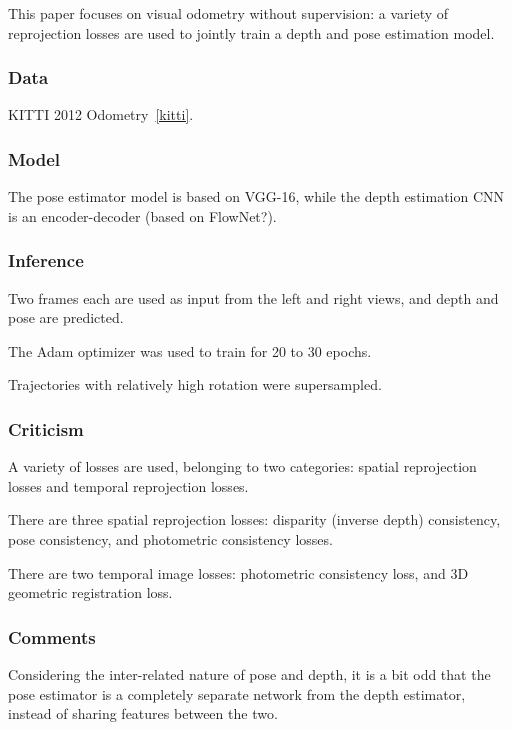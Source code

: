 \documentclass[a4paper, 12pt]{article}
\begin{document}
This paper focuses on visual odometry without supervision: a variety of
reprojection losses are used to jointly train a depth and pose estimation
model.


\subsubsection{Data}

KITTI 2012 Odometry~\ref{kitti}.


\subsubsection{Model}

The pose estimator model is based on VGG-16, while the depth estimation CNN is
an encoder-decoder (based on FlowNet?).


\subsubsection{Inference}

Two frames each are used as input from the left and right views, and depth and
pose are predicted.

The Adam optimizer was used to train for 20 to 30 epochs.

Trajectories with relatively high rotation were supersampled.


\subsubsection{Criticism}

A variety of losses are used, belonging to two categories: spatial reprojection
losses and temporal reprojection losses.

There are three spatial reprojection losses: disparity (inverse depth)
consistency, pose consistency, and photometric consistency losses.

There are two temporal image losses: photometric consistency loss, and 3D
geometric registration loss.


\subsubsection{Comments}

Considering the inter-related nature of pose and depth, it is a bit odd that
the pose estimator is a completely separate network from the depth estimator,
instead of sharing features between the two.
\end{document}
